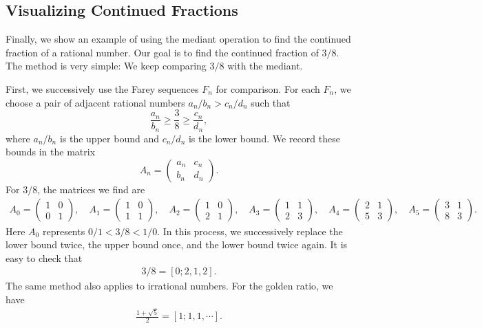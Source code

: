 \documentclass[10pt, a4paper]{article}
\theoremstyle{definition}
\theoremstyle{remark}
\begin{document}
\subsection{Visualizing Continued Fractions}

Finally, we show an example of using the mediant operation to find the continued fraction of a rational number. Our goal is to find the continued fraction of \(3/8\). The method is very simple: We keep comparing \(3/8\) with the mediant.

First, we successively use the Farey sequences \(F_n\) for comparison. For each \(F_n\), we choose a pair of adjacent rational numbers \(a_n/b_n>c_n/d_n\) such that
$$
\frac{a_n}{b_n}\ge \frac{3}{8}\ge \frac{c_n}{d_n},
$$
where \(a_n/b_n\) is the upper bound and \(c_n/d_n\) is the lower bound. We record these bounds in the matrix
$$
A_n=
\begin{pmatrix}
a_n & c_n \\
b_n & d_n
\end{pmatrix}.
$$
For \(3/8\), the matrices we find are
\begin{align*}
    A_0= \begin{pmatrix} 1 & 0 \\ 0 & 1 \end{pmatrix},\quad
    A_1 = \begin{pmatrix} 1 & 0 \\ 1 & 1 \end{pmatrix},\quad
    A_2 = \begin{pmatrix} 1 & 0 \\ 2 & 1 \end{pmatrix},\quad
    A_3 = \begin{pmatrix} 1 & 1 \\ 2 & 3 \end{pmatrix}, \quad
    A_4 = \begin{pmatrix} 2 & 1 \\ 5 & 3 \end{pmatrix}, \quad
    A_5 = \begin{pmatrix} 3 & 1 \\ 8 & 3 \end{pmatrix}.
\end{align*}
Here \(A_0\) represents \(0/1<3/8<1/0\). In this process, we successively replace the lower bound twice, the upper bound once, and the lower bound twice again. It is easy to check that
\begin{align*}
    3/8 = [0;2,1,2].
\end{align*}
The same method also applies to irrational numbers. For the golden ratio, we have
\begin{align*}
    \frac{1+\sqrt{5}}{2} = [1;1,1,\cdots].
\end{align*}
\end{document}
